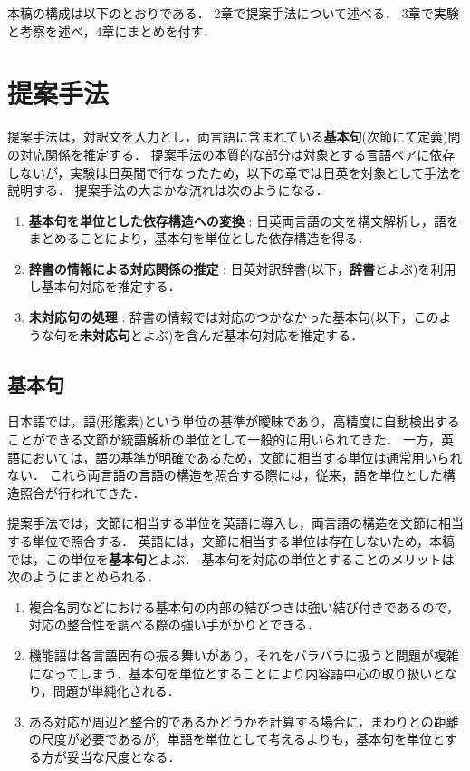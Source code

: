 本稿の構成は以下のとおりである．
2章で提案手法について述べる．
3章で実験と考察を述べ，4章にまとめを付す．

\section{提案手法}

提案手法は，対訳文を入力とし，両言語に含まれている{\bf 基本句}(次節にて定義)間の対応関係を推定する．
提案手法の本質的な部分は対象とする言語ペアに依存しないが，実験は日英間で行なったため，以下の章では日英を対象として手法を説明する．
提案手法の大まかな流れは次のようになる．

\vspace{1ex}
\begin{enumerate}

\item {\bf 基本句を単位とした依存構造への変換} : 
日英両言語の文を構文解析し，語をまとめることにより，基本句を単位とした依存構造を得る．

\item {\bf 辞書の情報による対応関係の推定} : 
日英対訳辞書(以下，{\bf 辞書}とよぶ)を利用し基本句対応を推定する．

\item {\bf 未対応句の処理} : 
辞書の情報では対応のつかなかった基本句(以下，このような句を{\bf 未対応句}とよぶ)を含んだ基本句対応を推定する．

\end{enumerate}
\vspace{1ex}

\subsection{基本句}
日本語では，語(形態素)という単位の基準が曖昧であり，高精度に自動検出することができる文節が統語解析の単位として一般的に用いられてきた．
一方，英語においては，語の基準が明確であるため，文節に相当する単位は通常用いられない．
これら両言語の言語の構造を照合する際には，従来，語を単位とした構造照合が行われてきた\cite{Matsumoto1993,Kaji1992}．

提案手法では，文節に相当する単位を英語に導入し，両言語の構造を文節に相当する単位で照合する．
英語には，文節に相当する単位は存在しないため，本稿では，この単位を{\bf 基本句}とよぶ．
基本句を対応の単位とすることのメリットは次のようにまとめられる．

\vspace{1ex}
\begin{enumerate}
\item 複合名詞などにおける基本句の内部の結びつきは強い結び付きであるので，対応の整合性を調べる際の強い手がかりとできる．
\item 機能語は各言語固有の振る舞いがあり，それをバラバラに扱うと問題が複雑になってしまう．基本句を単位とすることにより内容語中心の取り扱いとなり，問題が単純化される．
\item ある対応が周辺と整合的であるかどうかを計算する場合に，まわりとの距離の尺度が必要であるが，単語を単位として考えるよりも，基本句を単位とする方が妥当な尺度となる．
\end{enumerate}
\vspace{1ex}


